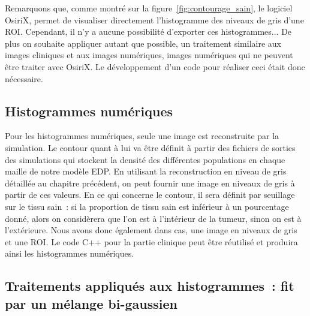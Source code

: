 \documentclass[main.tex]{subfiles}
\begin{document}
Remarquons que, comme montré sur la figure~\ref{fig:contourage_sain}, le logiciel OsiriX, permet de visualiser directement l'histogramme des niveaux de gris d'une ROI. Cependant, il n'y a aucune possibilité d'exporter ces histogrammes... De plus on souhaite appliquer autant que possible, un traitement similaire aux images cliniques et aux images numériques, images numériques qui ne peuvent être traiter avec OsiriX. Le développement d'un code pour réaliser ceci était donc nécessaire.


\subsection{Histogrammes numériques}
Pour les histogrammes numériques, seule une image est reconstruite par la simulation. Le contour quant à lui va être définit à partir des fichiers de sorties des simulations qui stockent la densité des différentes populations en chaque maille de notre modèle EDP. En utilisant la reconstruction en niveau de gris détaillée au chapitre précédent, on peut fournir une image en niveaux de gris à partir de ces valeurs. En ce qui concerne le contour, il sera définit par seuillage sur le tissu sain~: si la proportion de tissu sain est inférieur à un pourcentage donné, alors on considèrera que l'on est à l'intérieur de la tumeur, sinon on est à l'extérieure. Nous avons donc également dans cas, une image en niveaux de gris et une ROI. Le code C++ pour la partie clinique peut être réutilisé et produira ainsi les histogrammes numériques.

\subsection{Traitements appliqués aux histogrammes~: fit par un mélange bi-gaussien}
\end{document}
